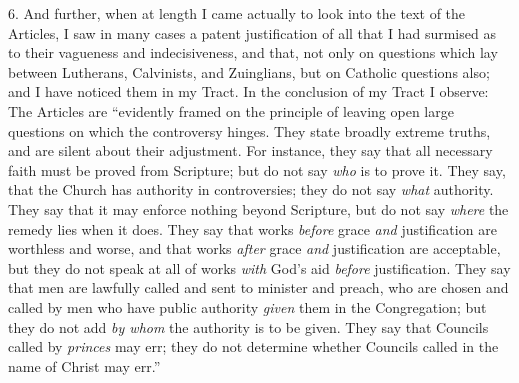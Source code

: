 6. And further, when at length I came actually to look into the text
of the Articles, I saw in many cases a patent justification of
all that I had surmised as to their vagueness and indecisiveness, and
that, not only on questions which lay between Lutherans,
Calvinists, and Zuinglians, but on Catholic questions also; and I have
noticed them in my Tract. In the conclusion of my Tract I observe: The
Articles are ``evidently framed on the principle of leaving open
large questions on which the controversy hinges. They state broadly
extreme truths, and are silent about their adjustment. For instance,
they say that all necessary faith must be proved from Scripture; but do
not say \emph{who} is to prove it. They say, that the Church has
authority in controversies; they do not say \emph{what} authority. They
say that it may enforce nothing beyond Scripture, but do not say \emph{where}
the remedy lies when it does. They say that works \emph{before} grace \emph{and}
justification are worthless and worse, and that works \emph{after} grace
\emph{and} justification are acceptable, but they do not speak at all of
works \emph{with} God's aid \emph{before} justification. They say that men are
lawfully called and sent to minister and preach, who are chosen and
called by men who have public authority \emph{given} them in the Congregation;
but they do not add \emph{by whom} the authority is to be given. They
say that Councils called by \emph{princes} may err; they do not
determine whether Councils called in the name of Christ may err.''

